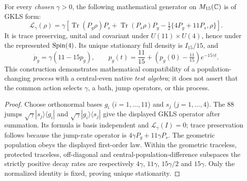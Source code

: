 \documentclass[12pt,a4paper]{article}
\begin{document}
\begin{proposition}
\label{p4:prop:v264-covariant-gkls-alternative}
For every \emph{chosen} $\gamma>0$, the following mathematical generator
on $M_{15}(\mathbb{C})$ is of GKLS form:
\[
 \boxed{\mathcal L_\gamma(\rho)=\gamma\left[
 \operatorname{Tr}(P_g\rho)P_s+
 \operatorname{Tr}(P_s\rho)P_g-
 \tfrac12\{4P_g+11P_s,\rho\}\right].}
\]
It is trace preserving, unital and covariant under
$U(11)\times U(4)$, hence under the represented $\mathrm{Spin}(4)$.
Its unique stationary full density is $I_{15}/15$, and
\[
 \dot p_g=\gamma(11-15p_g),\qquad
 p_g(t)=\frac{11}{15}+
 (p_g(0)-\tfrac{11}{15})e^{-15\gamma t}.
\]
This construction demonstrates mathematical compatibility of a
population-changing \emph{process} with a central-even native
\emph{test algebra}; it does not assert that the common action
selects $\gamma$, a bath, jump operators, or this process.
\end{proposition}
\begin{proof}
Choose orthonormal bases $g_i$ ($i=1,\ldots,11$) and $s_j$
($j=1,\ldots,4$). The $88$ jumps
$\sqrt\gamma|s_j\rangle\langle g_i|$ and
$\sqrt\gamma|g_i\rangle\langle s_j|$ give the displayed GKLS
operator after summation. Its formula is basis independent and
$\mathcal L_\gamma(I)=0$; trace preservation follows because the
jump-rate operator is $4\gamma P_g+11\gamma P_s$.
The geometric population obeys the displayed first-order law.
Within the geometric traceless, protected traceless, off-diagonal
and central-population-difference subspaces the strictly positive
decay rates are respectively $4\gamma$, $11\gamma$,
$15\gamma/2$ and $15\gamma$. Only the normalized identity is fixed,
proving unique stationarity.
\end{proof}
\end{document}
